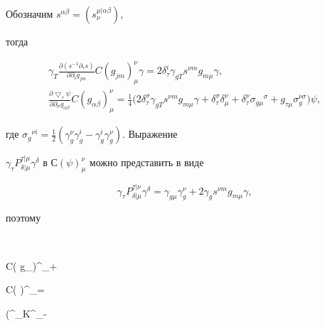 Обозначим $s^{\alpha\beta}=(s^{\mu|\alpha\beta}_\nu)$,


тогда


\begin{gather*}


\gamma_T\frac{\partial(s^{-1}\partial_\tau s)}


{\partial\partial_ig_{jm}}C(g_{jm})^\nu_\mu\gamma =


2\delta^i_\tau\gamma_{gT}s^{\nu m}g_{m\mu}\gamma, \\


%


\frac{\partial\bigtriangledown_\tau\psi}{\partial\partial_\sigma


g_{\alpha\beta}}C( g_{\alpha\beta})^\nu_\mu=


\frac{1}{4}\big(2\delta^\sigma_\tau\gamma_{gT}


s^{\nu m}g_{m\mu}\gamma+\delta^\sigma_\tau\delta^\nu_\mu+


\delta^\nu_\tau\sigma_{g\mu}{}^\sigma+


g_{\tau\mu}\sigma_{g}^{\nu \sigma}\big)\psi,


\end{gather*}


где $\sigma_g{}^{\nu i}=\frac{1}{2}(\gamma_g^\nu\gamma_g^i-


\gamma_g^i\gamma_g^\nu)$. Выражение


$\gamma_\tau P^{\tau|\mu}_{\delta|\mu}\gamma^


\delta$ в $С(\psi)^\nu_\mu$ можно представить в виде


$$


\gamma_\tau P^{\tau|\nu}_{\delta|\mu}\gamma^


\delta=\gamma_{g\mu}\gamma^\nu_g+2\gamma_gs^{\nu m}


g_{m\mu}\gamma,


$$


поэтому


$$




C( g_{\alpha\beta})^\nu_\mu+




C( \psi)^\nu_\mu=


\big(\Phi^\sigma\sigma_K{}^\nu{}_\mu-


